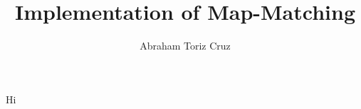 \documentclass[10pt,letterpaper]{article}
\author{Abraham Toriz Cruz}
\title{Implementation of Map-Matching}
\begin{document}
Hi
\end{document}
